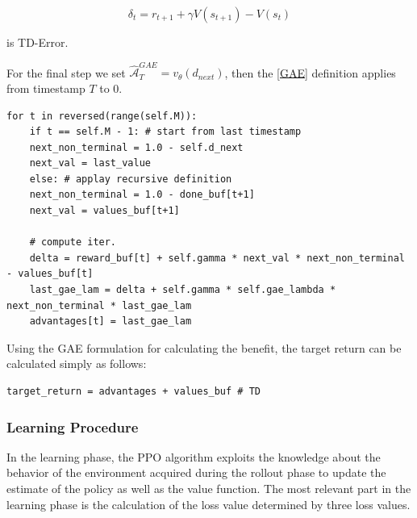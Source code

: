 \documentclass[main.tex]{subfiles}
\begin{document}
\begin{equation}
	\delta_t = r_{t+1} + \gamma V(s_{t+1}) - V(s_t) 
\end{equation}

is TD-Error.

For the final step we set $\hat{\mathcal{A}}_{T}^{GAE} = v_\theta(d_{next})$, then the \ref{GAE} definition applies from timestamp $T$ to $0$.
\begin{listing}[H]
	\centering
	\caption{GAE computation} 
	\label{codice:GAE}
	\begin{verbatim}
for t in reversed(range(self.M)):
	if t == self.M - 1: # start from last timestamp
	next_non_terminal = 1.0 - self.d_next 
	next_val = last_value
	else: # applay recursive definition
	next_non_terminal = 1.0 - done_buf[t+1]
	next_val = values_buf[t+1]
	
	# compute iter.
	delta = reward_buf[t] + self.gamma * next_val * next_non_terminal - values_buf[t]
	last_gae_lam = delta + self.gamma * self.gae_lambda * next_non_terminal * last_gae_lam
	advantages[t] = last_gae_lam
	\end{verbatim}
\end{listing}
Using the GAE formulation for calculating the benefit, the target return can be calculated simply as follows:

\begin{listing}[H]
	\centering
	\caption{Target Return computation} 
	\label{codice:TD}
	\begin{verbatim}
target_return = advantages + values_buf # TD
	\end{verbatim}
\end{listing}




\subsubsection{Learning Procedure}
In the learning phase, the PPO algorithm exploits the knowledge about the behavior of the environment acquired during the rollout phase to update the estimate of the policy as well as the value function. The most relevant part in the learning phase is the calculation of the loss value determined by three loss values.
\end{document}
